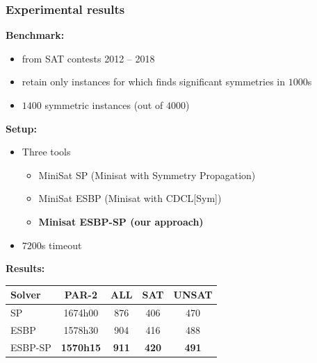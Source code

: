 \documentclass{beamer}
\begin{document}

\begin{frame}
\frametitle{Experimental results}
\scriptsize
\textbf{Benchmark:}
\begin{itemize}
	\item from SAT contests 2012 -- 2018
	\item retain only instances for which \bliss{} finds significant symmetries in $1000$s
	\item $1400$ symmetric instances (out of $4000$)
\end{itemize}

\vfill

\textbf{Setup:}
\begin{itemize}
	\item Three tools
	
	\begin{itemize}
		\item \scriptsize MiniSat SP (Minisat with Symmetry Propagation)
		\item \scriptsize MiniSat ESBP (Minisat with CDCL[Sym])
		\item \scriptsize \textbf{Minisat ESBP-SP (our approach)}
	\end{itemize}
	\item $7200$s timeout
\end{itemize}

\vfill
\textbf{Results:}

\centering

\begin{tabular}{lcccc}
	Solver & PAR-2 & ALL & SAT & UNSAT\\
	\toprule
	SP & 1674h00 & 876 & 406 & 470 \\
	ESBP & 1578h30 & 904 & 416 & 488\\
	ESBP-SP & \cellcolor{gray!30}\textbf{1570h15} & \cellcolor{gray!30}\textbf{911} & \cellcolor{gray!30}\textbf{420} & \cellcolor{gray!30}\textbf{491}\\	
\end{tabular}
\end{frame}

\end{document}
